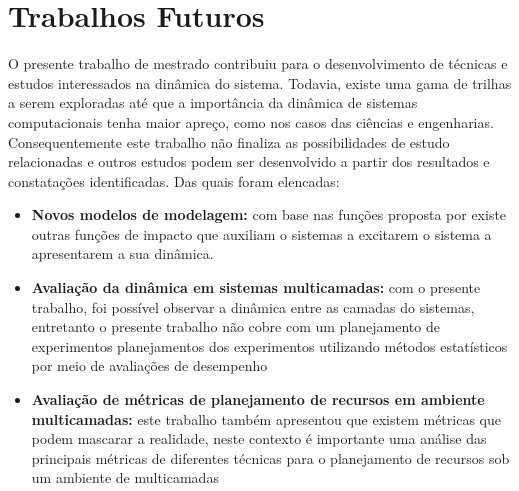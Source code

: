 \section{Trabalhos Futuros}
O presente trabalho de mestrado contribuiu para o desenvolvimento de técnicas e estudos interessados na dinâmica do sistema. Todavia, existe uma gama de trilhas a serem exploradas até que a importância da dinâmica de sistemas computacionais tenha maior apreço, como nos casos das ciências e engenharias. Consequentemente este trabalho não finaliza as possibilidades de estudo relacionadas e outros estudos podem ser desenvolvido a partir dos resultados e constatações identificadas. Das quais foram elencadas:
\begin{itemize}
	\item \textbf{Novos modelos de modelagem:} com base nas funções proposta por \cite{Hellerstein2004} existe outras funções de impacto que auxiliam o sistemas a excitarem o sistema a apresentarem a sua dinâmica. 
	\item \textbf{Avaliação da dinâmica em sistemas multicamadas:} com o presente trabalho, foi possível observar a dinâmica entre as camadas do sistemas, entretanto o presente trabalho não cobre com um planejamento de experimentos planejamentos dos experimentos utilizando métodos estatísticos por meio de avaliações de desempenho
	\item \textbf{Avaliação de métricas de planejamento de recursos em ambiente multicamadas:} este trabalho também apresentou que existem métricas que podem mascarar a realidade, neste contexto é importante uma análise das principais métricas de diferentes técnicas para o planejamento de recursos sob um ambiente de multicamadas
\end{itemize} 	
